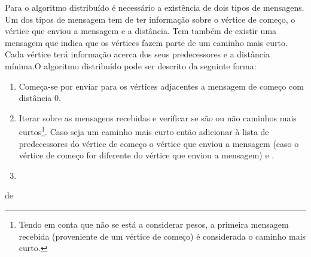 Para o algoritmo distribuído é necessário a existência de dois tipos de 
mensagens. Um dos tipos de mensagem tem de ter informação sobre o vértice de 
começo, o vértice que enviou a mensagem e a distância. Tem também de existir 
uma mensagem que indica que os vértices fazem parte de um caminho mais curto. 
Cada vértice terá informação acerca dos seus predecessores e a distância 
mínima.O algoritmo distribuído pode ser descrito da seguinte forma:
\begin{algorithm}
    \begin{minipage}{\linewidth}  \begin{enumerate}
      \item Começa-se por enviar para os vértices adjacentes a 
mensagem de começo com distância 0.
      \item Iterar sobre as mensagens recebidas e verificar se são ou não 
caminhos mais curtos\footnote{Tendo em conta que não se está a considerar 
pesos, a primeira mensagem recebida (proveniente de um vértice de começo) é 
considerada o caminho mais curto.}. Caso seja um caminho mais curto então 
adicionar à lista de predecessores do vértice de começo o vértice que enviou a 
mensagem (caso o vértice de começo for diferente do vértice que enviou a 
mensagem) e . 
      \item 
    \end{enumerate}
  \end{minipage}
\end{algorithm} de

